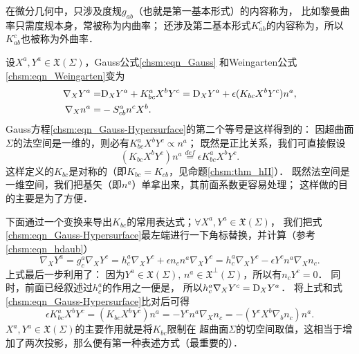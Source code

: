 在微分几何中，只涉及度规$g_{ab}$（也就是第一基本形式）的内容称为，
比如黎曼曲率只需度规本身，常被称为内曲率；
还涉及第二基本形式$K_{ab}^c$的内容称为，所以$K_{ab}^c$也被称为外曲率．

设$X^a, Y^a\in \mathfrak{X}(\Sigma)$，Gauss公式\eqref{chsm:eqn_Gauss}
和Weingarten公式\eqref{chsm:eqn_Weingarten}变为
\begin{align}
    {\nabla}_{X} Y^a =& {\rm D}_{X} Y^a + K^a_{bc}X^b Y^c={\rm D}_{X} Y^a
      + \epsilon (K_{bc} X^b Y^c) {n}^a, \label{chsm:eqn_Gauss-Hypersurface} \\
    {\nabla}_{X} {n}^a =& - S^a_{cb} {n}^c  X^b. \label{chsm:eqn_Weingarten-Hypersurface}
\end{align}
Gauss方程\eqref{chsm:eqn_Gauss-Hypersurface}的第二个等号是这样得到的：
因超曲面$\Sigma$的法空间是一维的，则必有$K^a_{bc} X^b Y^c \propto {n}^a$；
既然是正比关系，我们可直接假设
\begin{equation}\label{chsm:eqn_IIbc}
    (K_{bc} X^b Y^c) {n}^a \overset{def}{=} \epsilon K^a_{bc} X^b Y^c .
\end{equation}
这样定义的$K_{bc}$是对称的（即$K_{bc}=K_{cb}$，见命题\ref{chsm:thm_hII}）．
既然法空间是一维空间，我们把基矢（即${n}^a$）单拿出来，其前面系数更容易处理；
这样做的目的主要是为了方便．

下面通过一个变换来导出$K_{bc}$的常用表达式；$\forall X^a, Y^a\in \mathfrak{X}(\Sigma)$，
我们把式\eqref{chsm:eqn_Gauss-Hypersurface}最左端进行一下角标替换，并计算（参考\eqref{chsm:eqn_hdaub}）
\begin{equation*}
    \nabla_{X} Y^a = g_{c}^a \nabla_{X} Y^c =
    h_{c}^a\nabla_{X} Y^c +\epsilon {n}_c {n}^a \nabla_{X} Y^c
    = h_{c}^a\nabla_{X} Y^c - \epsilon Y^c {n}^a\nabla_{X}  {n}_c .
\end{equation*}
上式最后一步利用了：
因为$Y^a\in \mathfrak{X}(\Sigma),\, {n}^a\in \mathfrak{X}^\bot(\Sigma)$，所以有${n}_c Y^c=0$．
同时，前面已经叙述过$h_{c}^a$的作用之一便是，
所以$h_{c}^a\nabla_{X} Y^c={\rm D}_{X} Y^a$．
将上式和式\eqref{chsm:eqn_Gauss-Hypersurface}比对后可得
\begin{equation}\label{chsm:eqn_KabcKab}
     \epsilon K^a_{bc} X^b Y^c =(K_{bc} X^b Y^c) {n}^a =-Y^c {n}^a\nabla_{X}  {n}_c
     =-(Y^c  X^b\nabla_{b} {n}_c ){n}^a .
\end{equation}
$X^a,Y^a\in \mathfrak{X}(\Sigma)$的主要作用就是将$K_{bc}$限制在
超曲面$\Sigma$的切空间取值，这相当于增加了两次投影，那么便有第一种表述方式（最重要的）．


